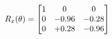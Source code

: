 \documentclass[preview]{standalone}
\begin{document}
\begin{align*}
\special{dvisvgm:raw <g id='unique000'>}R_{x}(\theta) = \begin{bmatrix}1 & 0 & 0 \\0 & -0.96 & -0.28 \\0 & +0.28 & -0.96\end{bmatrix}\special{dvisvgm:raw </g>}
\end{align*}
\end{document}
